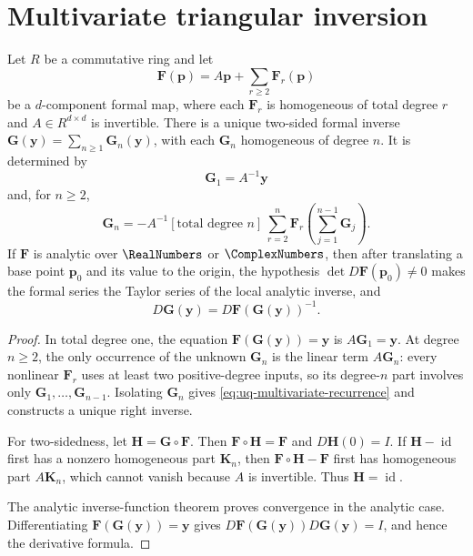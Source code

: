 \section{Multivariate triangular inversion}
\label{sec:uq-multivariate-recursion}

\begin{theorem}
\label{thm:uq-multivariate-triangular-inverse}
Let \(R\) be a commutative ring and let
\[
 \bm F(\bm p)=A\bm p+\sum_{r\ge2}\bm F_r(\bm p)
\]
be a \(d\)-component formal map, where each \(\bm F_r\) is homogeneous of
total degree \(r\) and \(A\in R^{d\times d}\) is invertible.  There is a
unique two-sided formal inverse
\(\bm G(\bm y)=\sum_{n\ge1}\bm G_n(\bm y)\), with each \(\bm G_n\)
homogeneous of degree \(n\).  It is determined by
\[
 \bm G_1=A^{-1}\bm y
\]
and, for \(n\ge2\),
\begin{equation}
\label{eq:uq-multivariate-recurrence}
 \bm G_n
 =-A^{-1}[\text{total degree }n]\,
 \sum_{r=2}^{n}
 \bm F_r\!\left(\sum_{j=1}^{n-1}\bm G_j\right).
\end{equation}
If \(\bm F\) is analytic over \(\RealNumbers\) or \(\ComplexNumbers\), then after translating a
base point \(\bm p_0\) and its value to the origin, the hypothesis
\(\det D\bm F(\bm p_0)\ne0\) makes the formal series the Taylor series of
the local analytic inverse, and
\[
 D\bm G(\bm y)=D\bm F(\bm G(\bm y))^{-1}.
\]
\end{theorem}

\begin{proof}
In total degree one, the equation
\(\bm F(\bm G(\bm y))=\bm y\) is \(A\bm G_1=\bm y\).
At degree \(n\ge2\), the only occurrence of the unknown
\(\bm G_n\) is the linear term \(A\bm G_n\): every nonlinear
\(\bm F_r\) uses at least two positive-degree inputs, so its degree-\(n\)
part involves only \(\bm G_1,\ldots,\bm G_{n-1}\).  Isolating
\(\bm G_n\) gives \eqref{eq:uq-multivariate-recurrence} and constructs a
unique right inverse.

For two-sidedness, let \(\bm H=\bm G\circ\bm F\).  Then
\(\bm F\circ\bm H=\bm F\) and \(D\bm H(0)=I\).  If
\(\bm H-\operatorname{id}\) first has a nonzero homogeneous part
\(\bm K_n\), then \(\bm F\circ\bm H-\bm F\) first has homogeneous part
\(A\bm K_n\), which cannot vanish because \(A\) is invertible.  Thus
\(\bm H=\operatorname{id}\).

The analytic inverse-function theorem proves convergence in the analytic
case.  Differentiating
\(\bm F(\bm G(\bm y))=\bm y\) gives
\(D\bm F(\bm G(\bm y))D\bm G(\bm y)=I\), and hence the derivative formula.
\end{proof}


